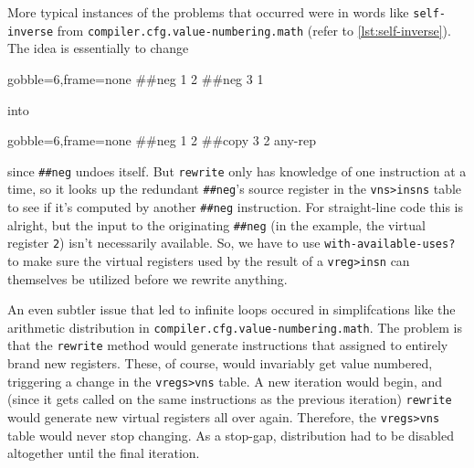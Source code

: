 \begin{sloppypar}
More typical instances of the problems that occurred were in words like
\Verb|self-inverse| from \Verb|compiler.cfg.value-numbering.math| (refer to
\vref{lst:self-inverse}).  The idea is essentially to change
%
\begin{center}
  \begin{minipage}{0.2\linewidth}
    \begin{factorcode*}{gobble=6,frame=none}
      ##neg 1 2
      ##neg 3 1
    \end{factorcode*}
  \end{minipage}
\end{center}
%
\noindent into
%
\begin{center}
  \begin{minipage}{0.2\linewidth}
    \begin{factorcode*}{gobble=6,frame=none}
      ##neg 1 2
      ##copy 3 2 any-rep
    \end{factorcode*}
  \end{minipage}
\end{center}
%
\noindent since \Verb|##neg| undoes itself.  But \Verb|rewrite| only has
knowledge of one instruction at a time, so it looks up the redundant
\Verb|##neg|'s source register in the \Verb|vns>insns| table to see if it's
computed by another \Verb|##neg| instruction.  For straight-line code this is
alright, but the input to the originating \Verb|##neg| (in the example, the
virtual register \Verb|2|) isn't necessarily available.  So, we have to use
\Verb|with-available-uses?| to make sure the virtual registers used by the
result of a \Verb|vreg>insn| can themselves be utilized before we rewrite
anything.
\end{sloppypar}


An even subtler issue that led to infinite loops occured in simplifcations like
the arithmetic distribution in \Verb|compiler.cfg.value-numbering.math|.  The
problem is that the \Verb|rewrite| method would generate instructions that
assigned to entirely brand new registers.  These, of course, would invariably
get value numbered, triggering a change in the \Verb|vregs>vns| table.  A new
iteration would begin, and (since it gets called on the same instructions as
the previous iteration) \Verb|rewrite| would generate new virtual registers
all over again.  Therefore, the \Verb|vregs>vns| table would never stop
changing.  As a stop-gap, distribution had to be disabled altogether until the
final iteration.

